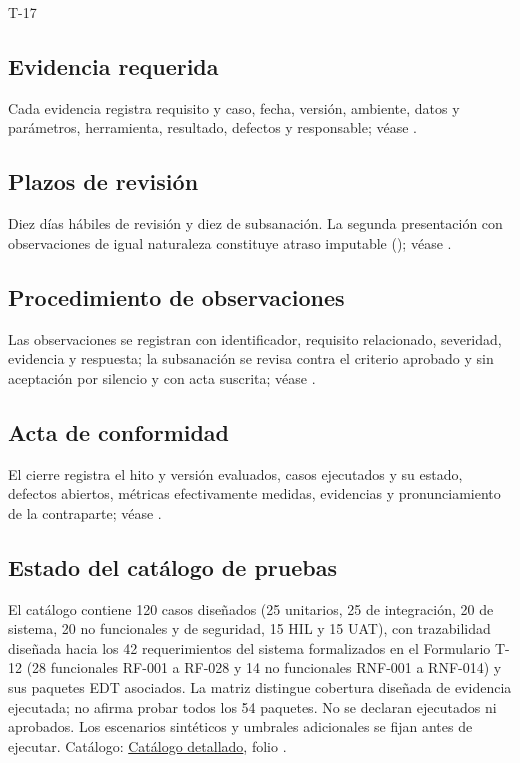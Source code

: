 \begin{formulario}{T-17}
\subsection*{Evidencia requerida}

Cada evidencia registra requisito y caso, fecha, versión, ambiente, datos y parámetros, herramienta, resultado, defectos y responsable; véase .

\subsection*{Plazos de revisión}

Diez días hábiles de revisión y diez de subsanación. La segunda presentación con observaciones de igual naturaleza constituye atraso imputable (); véase .

\subsection*{Procedimiento de observaciones}

Las observaciones se registran con identificador, requisito relacionado, severidad, evidencia y respuesta; la subsanación se revisa contra el criterio aprobado y sin aceptación por silencio y con acta suscrita; véase .

\subsection*{Acta de conformidad}

El cierre registra el hito y versión evaluados, casos ejecutados y su estado, defectos abiertos, métricas efectivamente medidas, evidencias y pronunciamiento de la contraparte; véase .



\subsection*{Estado del catálogo de pruebas}

El catálogo contiene 120 casos diseñados (25 unitarios, 25 de integración, 20 de sistema, 20 no funcionales y de seguridad, 15 HIL y 15 UAT), con trazabilidad diseñada hacia los 42 requerimientos del sistema formalizados en el Formulario T-12 (28 funcionales RF-001 a RF-028 y 14 no funcionales RNF-001 a RNF-014) y sus paquetes EDT asociados. La matriz distingue cobertura diseñada de evidencia ejecutada; no afirma probar todos los 54 paquetes. No se declaran ejecutados ni aprobados. Los escenarios sintéticos y umbrales adicionales se fijan antes de ejecutar. Catálogo: \hyperref[sec:9-catalogo]{Catálogo detallado}, folio \pageref{sec:9-catalogo}.


\end{formulario}
